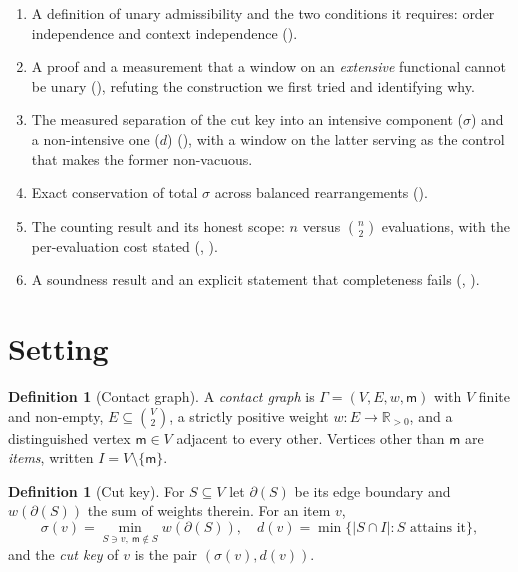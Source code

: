 \documentclass[11pt,twocolumn,a4paper]{article}
\theoremstyle{upthm}
\theoremstyle{definition}
\newtheorem{definition}[theorem]{Definition}
\theoremstyle{remark}
\newcommand{\R}{\mathbb{R}}
\newcommand{\Gph}{\Gamma}
\newcommand{\V}{V}
\newcommand{\E}{E}
\newcommand{\wt}{w}
\newcommand{\med}{\mathsf{m}}
\newcommand{\cut}{\partial}
\newcommand{\sep}{\sigma}
\newcommand{\dep}{d}
\newcommand{\abs}[1]{\lvert#1\rvert}
\begin{document}
\begin{enumerate}[label=(\roman*),leftmargin=2.2em,itemsep=2pt]
\item A definition of unary admissibility and the two conditions it
requires: order independence and context independence
().
\item A proof and a measurement that a window on an \emph{extensive}
functional cannot be unary (), refuting the
construction we first tried and identifying why.
\item The measured separation of the cut key into an intensive component
($\sep$) and a non-intensive one ($\dep$)
(), with a window on the latter serving as the
control that makes the former non-vacuous.
\item Exact conservation of total $\sep$ across balanced rearrangements
().
\item The counting result and its honest scope: $n$ versus
$\binom{n}{2}$ evaluations, with the per-evaluation cost stated
(, ).
\item A soundness result and an explicit statement that completeness
fails (, ).
\end{enumerate}

\section{Setting}
\label{sec:setting}

\begin{definition}[Contact graph]
\label{def:graph}
A \emph{contact graph} is $\Gph=(\V,\E,\wt,\med)$ with $\V$ finite and
non-empty, $\E\subseteq\binom{\V}{2}$, a strictly positive weight
$\wt\colon\E\to\R_{>0}$, and a distinguished vertex $\med\in\V$ adjacent
to every other. Vertices other than $\med$ are \emph{items}, written
$I=\V\setminus\{\med\}$.
\end{definition}

\begin{definition}[Cut key]
\label{def:key}
For $S\subseteq\V$ let $\cut(S)$ be its edge boundary and
$\wt(\cut(S))$ the sum of weights therein. For an item $v$,
\[
\sep(v)=\min_{S\ni v,\ \med\notin S}\wt(\cut(S)),
\quad
\dep(v)=\min\{\abs{S\cap I}:S\text{ attains it}\},
\]
and the \emph{cut key} of $v$ is the pair $(\sep(v),\dep(v))$.
\end{definition}
\end{document}
